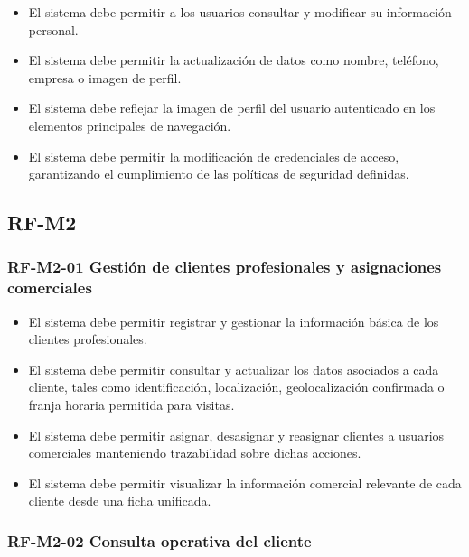 \begin{itemize}
    \item El sistema debe permitir a los usuarios consultar y modificar su información personal.
    \item El sistema debe permitir la actualización de datos como nombre, teléfono, empresa o imagen de perfil.
    \item El sistema debe reflejar la imagen de perfil del usuario autenticado en los elementos principales de navegación.
    \item El sistema debe permitir la modificación de credenciales de acceso, garantizando el cumplimiento de las políticas de seguridad definidas.
\end{itemize}

\subsection{RF-M2}

\vspace{-0.75em}
\subsubsection{RF-M2-01 Gestión de clientes profesionales y asignaciones comerciales}
\vspace{-1em}

\begin{itemize}
    \item El sistema debe permitir registrar y gestionar la información básica de los clientes profesionales.
    \item El sistema debe permitir consultar y actualizar los datos asociados a cada cliente, tales como identificación, localización, geolocalización confirmada o franja horaria permitida para visitas.
    \item El sistema debe permitir asignar, desasignar y reasignar clientes a usuarios comerciales manteniendo trazabilidad sobre dichas acciones.
    \item El sistema debe permitir visualizar la información comercial relevante de cada cliente desde una ficha unificada.
\end{itemize}

\vspace{-0.75em}
\subsubsection{RF-M2-02 Consulta operativa del cliente}
\vspace{-1em}

